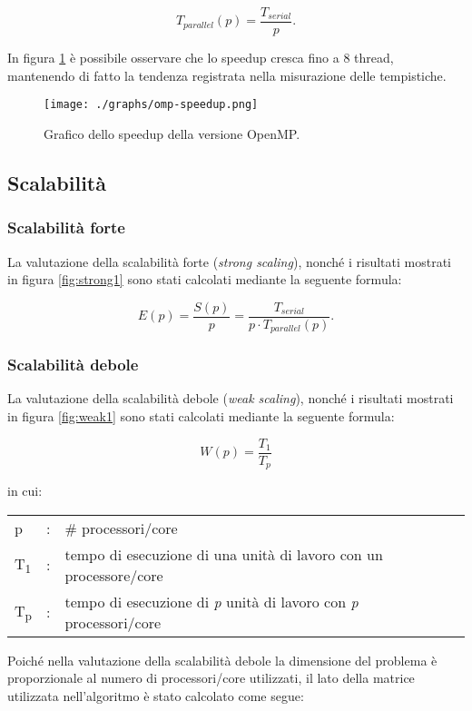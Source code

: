 \[
T_{parallel}(p) = \frac{T_{serial}}{p}.
\]

In figura \ref{fig:speedup1} è possibile osservare che lo speedup cresca fino a
8 thread, mantenendo di fatto la tendenza registrata nella misurazione delle
tempistiche.

\begin{figure}[!ht]
  \centering
  \texttt{[image: ./graphs/omp-speedup.png]}
  \caption{Grafico dello speedup della versione OpenMP.}\label{fig:speedup1}
\end{figure}

\subsection{Scalabilità}

\subsubsection{Scalabilità forte}

La valutazione della scalabilità forte (\textit{strong scaling}), nonché i
risultati mostrati in figura \ref{fig:strong1} sono stati calcolati mediante
la seguente formula:

\[
    E(p) = \frac{S(p)}{p} = \frac{T_{serial}}{p \cdot T_{parallel}(p)}.
\]

\subsubsection{Scalabilità debole}

La valutazione della scalabilità debole (\textit{weak scaling}), nonché i
risultati mostrati in figura \ref{fig:weak1} sono stati calcolati mediante
la seguente formula:

\[
W(p) = \frac{T_{1}}{T_{p}}
\]

in cui:
\begin{table}[!ht]
\begin{tabular}{lll}
    p &: & \# processori/core\\
    T\textsubscript{1}&: & tempo di esecuzione di una unità di lavoro con un
    processore/core\\
    T\textsubscript{p}&: & tempo di esecuzione di \textit{p} unità di lavoro con
    \textit{p} processori/core
\end{tabular}
\end{table}

Poiché nella valutazione della scalabilità debole la dimensione del problema è
proporzionale al numero di processori/core utilizzati, il lato della matrice
utilizzata nell'algoritmo è stato calcolato come segue:

